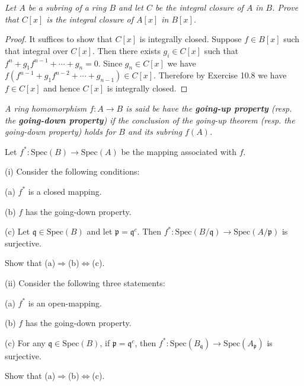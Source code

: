 \begin{problem}\em
Let $A$ be a subring of a ring $B$ and let $C$ be the integral closure of $A$ in $B$. Prove that $C[x]$ is the integral closure of $A[x]$ in $B[x]$.
\end{problem}
\begin{proof}
It suffices to show that $C[x]$ is integrally closed. Suppose $f\in B[x]$ such that integral over $C[x]$. Then there exists $g_i\in C[x]$ such that $f^n+g_1f^{n-1}+\cdots+g_n=0$. Since $g_n\in C[x]$ we have $f(f^{n-1}+g_1f^{n-2}+\cdots+g_{n-1})\in C[x]$. Therefore by Exercise 10.8 we have $f\in C[x]$ and hence $C[x]$ is integrally closed.
\end{proof}
\begin{problem}\em
A ring homomorphism $f:A\to B$ is said be have the \textbf{going-up property} (resp. the \textbf{going-down property}) if the conclusion of the going-up theorem (resp. the going-down property) holds for $B$ and its subring $f(A)$.\par
Let $f^*:\mathrm{Spec}(B)\to\mathrm{Spec}(A)$ be the mapping associated with $f$.\par
(i) Consider the following conditions:\par
\hspace{0.5cm}(a) $f^*$ is a closed mapping.\par
\hspace{0.5cm}(b) $f$ has the going-down property.\par
\hspace{0.5cm}(c) Let $\mathfrak{q}\in\mathrm{Spec}(B)$ and let $\mathfrak{p}=\mathfrak{q}^c$. Then $f^*:\mathrm{Spec}(B/\mathfrak{q})\to\mathrm{Spec}(A/\mathfrak{p})$ is surjective.\par
Show that (a)$\Rightarrow$(b)$\Leftrightarrow$(c).\par
(ii) Consider the following three statements:\par
\hspace{0.5cm}(a) $f^*$ is an open-mapping.\par
\hspace{0.5cm}(b) $f$ has the going-down property.\par
\hspace{0.5cm}(c) For any $\mathfrak{q}\in\mathrm{Spec}(B)$, if $\mathfrak{p}=\mathfrak{q}^c$, then $f^*:\mathrm{Spec}(B_\mathfrak{q})\to\mathrm{Spec}(A_\mathfrak{p})$ is surjective.\par
Show that (a)$\Rightarrow$(b)$\Leftrightarrow$(c).
\end{problem}
